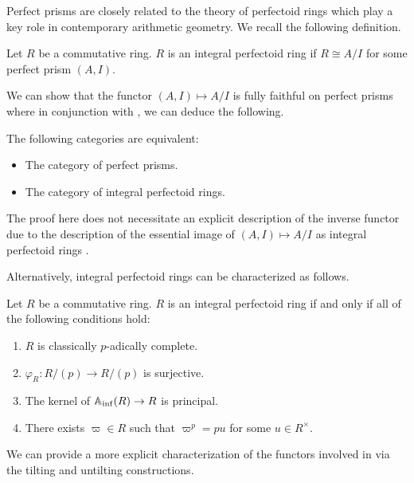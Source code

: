 Perfect prisms are closely related to the theory of perfectoid rings which play a key role in contemporary arithmetic geometry. We recall the following definition. 
\begin{definition}\label{def: integral perfectoid ring}
    Let $R$ be a commutative ring. $R$ is an integral perfectoid ring if $R\cong A/I$ for some perfect prism $(A,I)$. 
\end{definition}
We can show that the functor $(A,I)\mapsto A/I$ is fully faithful on perfect prisms where in conjunction with , we can deduce the following. 
\begin{proposition}\label{prop: equivalence of categories perfect prisms and perfectoid rings}
    The following categories are equivalent:
    \begin{itemize}
        \item The category of perfect prisms. 
        \item The category of integral perfectoid rings. 
    \end{itemize}
\end{proposition}
\begin{remark}
    The proof here does not necessitate an explicit description of the inverse functor due to the description of the essential image of $(A,I)\mapsto A/I$ as integral perfectoid rings . 
\end{remark}
Alternatively, integral perfectoid rings can be characterized as follows. 
\begin{proposition}\label{prop: characterization of integral perfectoid rings}
    Let $R$ be a commutative ring. $R$ is an integral perfectoid ring if and only if all of the following conditions hold:
    \begin{enumerate}[label=(\roman*)]
        \item $R$ is classically $p$-adically complete. 
        \item $\varphi_{R}:R/(p)\to R/(p)$ is surjective. 
        \item The kernel of $\mathbb{A}_{\inf}(R)\to R$ is principal. 
        \item There exists $\varpi\in R$ such that $\varpi^{p}=pu$ for some $u\in R^{\times}$. 
    \end{enumerate}
\end{proposition}
We can provide a more explicit characterization of the functors involved in  via the tilting and untilting constructions. 
